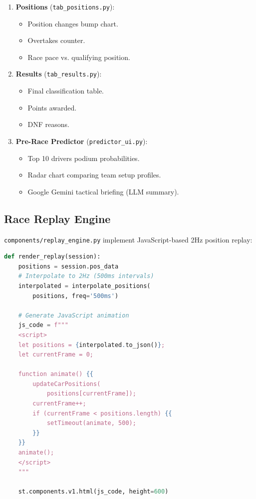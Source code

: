 \documentclass[conference,10pt]{IEEEtran}
\begin{document}
\begin{enumerate}
    \item \textbf{Positions} (\texttt{tab\_positions.py}):
    \begin{itemize}
        \item Position changes bump chart.
        \item Overtakes counter.
        \item Race pace vs. qualifying position.
    \end{itemize}

    \item \textbf{Results} (\texttt{tab\_results.py}):
    \begin{itemize}
        \item Final classification table.
        \item Points awarded.
        \item DNF reasons.
    \end{itemize}

    \item \textbf{Pre-Race Predictor} (\texttt{predictor\_ui.py}):
    \begin{itemize}
        \item Top 10 drivers podium probabilities.
        \item Radar chart comparing team setup profiles.
        \item Google Gemini tactical briefing (LLM summary).
    \end{itemize}
\end{enumerate}

\subsection{Race Replay Engine}

\texttt{components/replay\_engine.py} implement JavaScript-based 2Hz position replay:

\begin{lstlisting}[language=Python]
def render_replay(session):
    positions = session.pos_data
    # Interpolate to 2Hz (500ms intervals)
    interpolated = interpolate_positions(
        positions, freq='500ms')

    # Generate JavaScript animation
    js_code = f"""
    <script>
    let positions = {interpolated.to_json()};
    let currentFrame = 0;

    function animate() {{
        updateCarPositions(
            positions[currentFrame]);
        currentFrame++;
        if (currentFrame < positions.length) {{
            setTimeout(animate, 500);
        }}
    }}
    animate();
    </script>
    """

    st.components.v1.html(js_code, height=600)
\end{lstlisting}
\end{document}
